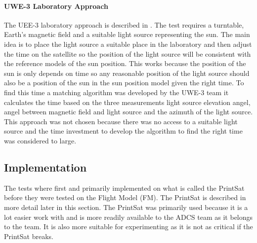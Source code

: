 \paragraph{UWE-3 Laboratory Approach}
The UEE-3 laboratory approach is described in \cite{UWE-3}. The test requires a turntable, Earth's magnetic field and a suitable light source representing the sun. The main idea is to place the light source a suitable place in the laboratory and then adjust the time on the satellite so the position of the light source will be consistent with the reference models of the sun position. This works because the position of the sun is only depends on time so any reasonable position of the light source should also be a position of the sun in the sun position model given the right time. To find this time a matching algorithm was developed by the UWE-3 team it calculates the time based on the three measurements light source elevation angel, angel between magnetic field and light source and the azimuth of the light source. This approach was not chosen because there was no access to a suitable light source and the time investment to develop the algorithm to find the right time was considered to large.

\subsection{Implementation}
The tests where first and primarily implemented on what is called the PrintSat before they were tested on the Flight Model (FM). The PrintSat is described in more detail later in this section. The PrintSat was primarily used because it is a lot easier work with and is more readily available to the ADCS team as it belongs to the team. It is also more suitable for experimenting as it is not as critical if the PrintSat breaks.     

